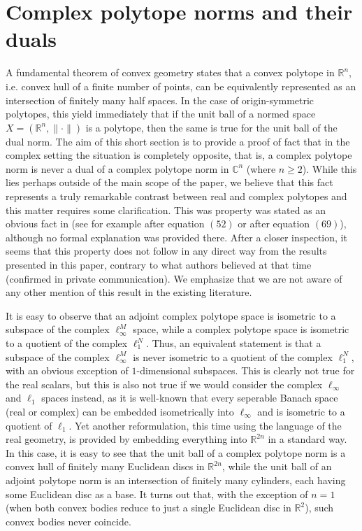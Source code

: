 \documentclass[12pt, reqno]{amsart}
\theoremstyle{definition}
\theoremstyle{remark}
\numberwithin{equation}{section}
\begin{document}
\section{Complex polytope norms and their duals}
\label{sectionnorms}

A fundamental theorem of convex geometry states that a convex polytope in $\mathbb{R}^n$, i.e. convex hull of a finite number of points, can be equivalently represented as an intersection of finitely many half spaces. In the case of origin-symmetric polytopes, this yield immediately that if the unit ball of a normed space $X=(\mathbb{R}^n, \| \cdot \|)$ is a polytope, then the same is true for the unit ball of the dual norm. The aim of this short section is to provide a proof of fact that in the complex setting the situation is completely opposite, that is, a complex polytope norm is never a dual of a complex polytope norm in $\mathbb{C}^n$ (where $n \geq 2$). While this lies perhaps outside of the main scope of the paper, we believe that this fact represents a truly remarkable contrast between real and complex polytopes and this matter requires some clarification. This was property was stated as an obvious fact in \cite{complexpolytope} (see for example after equation $(52)$ or after equation $(69)$), although no formal explanation was provided there. After a closer inspection, it seems that this property does not follow in any direct way from the results presented in this paper, contrary to what authors believed at that time (confirmed in private communication). We emphasize that we are not aware of any other mention of this result in the existing literature.

It is easy to observe that an adjoint complex polytope space is isometric to a subspace of the complex $\ell_{\infty}^M$ space, while a complex polytope space is isometric to a quotient of the complex $\ell_{1}^N$. Thus, an equivalent statement is that a subspace of the complex $\ell_{\infty}^M$ is never isometric to a quotient of the complex $\ell_{1}^N$, with an obvious exception of $1$-dimensional subspaces. This is clearly not true for the real scalars, but this is also not true if we would consider the complex $\ell_{\infty}$ and $\ell_1$ spaces instead, as it is well-known that every seperable Banach space (real or complex) can be embedded isometrically into $\ell_{\infty}$ and is isometric to a quotient of $\ell_1$. Yet another reformulation, this time using the language of the real geometry, is provided by embedding everything into $\mathbb{R}^{2n}$ in a standard way. In this case, it is easy to see that the unit ball of a complex polytope norm is a convex hull of finitely many Euclidean discs in $\mathbb{R}^{2n}$, while the unit ball of an adjoint polytope norm is an intersection of finitely many cylinders, each having some Euclidean disc as a base. It turns out that, with the exception of $n=1$ (when both convex bodies reduce to just a single Euclidean disc in $\mathbb{R}^2$), such convex bodies never coincide.
\end{document}

